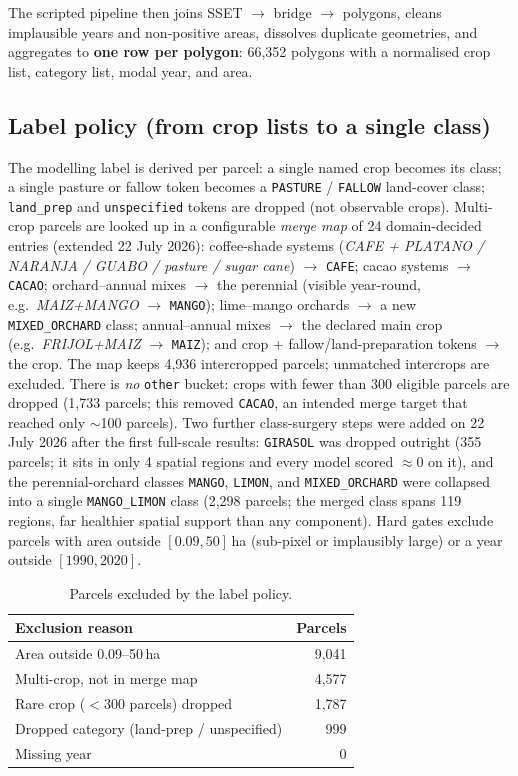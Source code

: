 \documentclass[11pt,a4paper]{article}
\begin{document}
The scripted pipeline then joins SSET $\to$ bridge $\to$ polygons, cleans implausible years and
non-positive areas, dissolves duplicate geometries, and aggregates to \textbf{one row per
polygon}: 66{,}352 polygons with a normalised crop list, category list, modal year, and area.

\subsection{Label policy (from crop lists to a single class)}

The modelling label is derived per parcel: a single named crop becomes its class; a single
pasture or fallow token becomes a \texttt{PASTURE} / \texttt{FALLOW} land-cover class;
\texttt{land\_prep} and \texttt{unspecified} tokens are dropped (not observable crops).
Multi-crop parcels are looked up in a configurable \emph{merge map} of 24 domain-decided
entries (extended 22 July 2026): coffee-shade systems (\emph{CAFE + PLATANO / NARANJA /
GUABO / pasture / sugar cane}) $\to$ \texttt{CAFE}; cacao systems $\to$ \texttt{CACAO};
orchard--annual mixes $\to$ the perennial (visible year-round, e.g.\ \emph{MAIZ+MANGO} $\to$
\texttt{MANGO}); lime--mango orchards $\to$ a new \texttt{MIXED\_ORCHARD} class;
annual--annual mixes $\to$ the declared main crop (e.g.\ \emph{FRIJOL+MAIZ} $\to$
\texttt{MAIZ}); and crop + fallow/land-preparation tokens $\to$ the crop. The map keeps
4{,}936 intercropped parcels; unmatched intercrops are excluded. There is \emph{no}
\texttt{other} bucket: crops with fewer than 300 eligible parcels are dropped (1{,}733
parcels; this removed \texttt{CACAO}, an intended merge target that reached only
$\sim$100 parcels). Two further class-surgery steps were added on 22 July 2026 after the
first full-scale results: \texttt{GIRASOL} was dropped outright (355 parcels; it sits in
only 4 spatial regions and every model scored $\approx$0 on it), and the perennial-orchard
classes \texttt{MANGO}, \texttt{LIMON}, and \texttt{MIXED\_ORCHARD} were collapsed into a
single \texttt{MANGO\_LIMON} class (2{,}298 parcels; the merged class spans 119 regions,
far healthier spatial support than any component). Hard gates exclude parcels with area
outside $[0.09, 50]$\,ha (sub-pixel or implausibly large) or a year outside $[1990, 2020]$.

\begin{table}[ht]
\centering\small
\caption{Parcels excluded by the label policy.}
\begin{tabular}{@{}lr@{}}
\toprule
Exclusion reason & Parcels \\
\midrule
Area outside 0.09--50\,ha & 9{,}041 \\
Multi-crop, not in merge map & 4{,}577 \\
Rare crop ($<$300 parcels) dropped & 1{,}787 \\
Dropped category (land-prep / unspecified) & 999 \\
Missing year & 0 \\
\bottomrule
\end{tabular}
\end{table}
\end{document}
